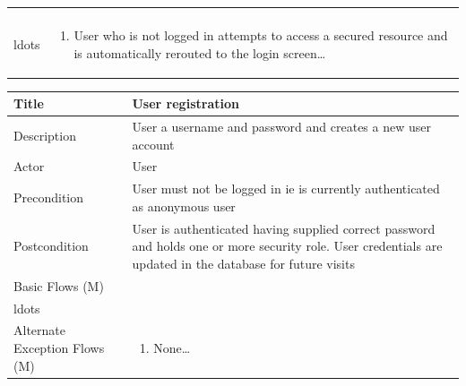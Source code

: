 \documentclass[a4paper,12pt]{article}
\newcommand\addrow[2]{#1 &#2\\ }
\newcommand\addheading[2]{#1 &#2\\ \hline}
\newcommand\tabularhead{\begin{tabular}{lp{11cm}}
\hline
}
\newcommand\addmulrow[2]{ \begin{minipage}[t][][t]{3cm}#1\end{minipage}%
   &\begin{minipage}[t][][t]{11cm}
    \begin{enumerate} #2   \end{enumerate}
    \end{minipage}\\ }
\newenvironment{usecase}{\tabularhead}
{\hline\end{tabular}}
\begin{document}
\begin{samepage}
\begin{usecase}
{                                  \item Controller method checks username and password against user repository. If credentials are matched to repository logs user in and set the user as authenticate, allocating any roles held by that user
                                  \item If credentials are not matched to repositoryare display login failed message and redisplay the login screen\\ldots}
  \addmulrow{Alternate Exception Flows (M)}{\item User who is not logged in attempts to access a secured resource and is automatically rerouted to the login screen\ldots}
                                  
\end{usecase}

\begin{usecase}
    \addheading{Title}{User registration}
  \addheading{Description}{User a username and password and creates a new user account}
  
  \addheading{Actor}{User} 
  \addrow{Precondition}{User must not be logged in ie is currently authenticated as anonymous user}
  \addrow{Postcondition}{User is authenticated having supplied correct password and holds one or more security role. User credentials are updated in the database for future visits}
  \addmulrow{Basic Flows (M)}{\item User navigates to register area via base template button which is shown on all pages when the user is not currently logged in \ldots
                                  \item User enters username and password and clicks login\ldots
                                  \item Controller method checks username and password against user repository. If credentials supplied are valid, and do not duplicate an existing user account the user is set to a logged in stage and the database is updated
                                  \item If credentials are matched to an existing user record in the repository display the registration failed message and redisplay the registration form screen\\ldots}
  \addmulrow{Alternate Exception Flows (M)}{\item None\ldots}
                                  
\end{usecase}


\end{samepage}
\end{document}
